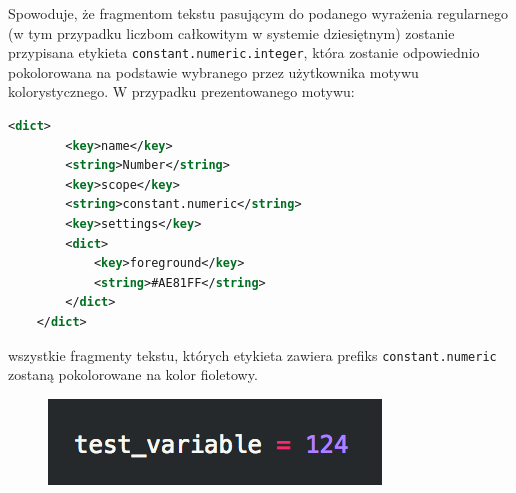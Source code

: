 Spowoduje, że fragmentom tekstu pasującym do podanego wyrażenia regularnego (w tym przypadku liczbom całkowitym w systemie dziesiętnym) zostanie przypisana etykieta \texttt{constant.numeric.integer}, która zostanie odpowiednio pokolorowana na podstawie wybranego przez użytkownika motywu kolorystycznego. W przypadku prezentowanego motywu:

\begin{lstlisting}[language=XML, morekeywords={dict,key,string}]
    <dict>
        <key>name</key>
        <string>Number</string>
        <key>scope</key>
        <string>constant.numeric</string>
        <key>settings</key>
        <dict>
            <key>foreground</key>
            <string>#AE81FF</string>
        </dict>
    </dict>
\end{lstlisting}

wszystkie fragmenty tekstu, których etykieta zawiera prefiks \texttt{constant.numeric} zostaną pokolorowane na kolor fioletowy.

\begin{figure}[H]
\centering
\includegraphics{Chapters/kolorowanie_skladni}
\end{figure}
